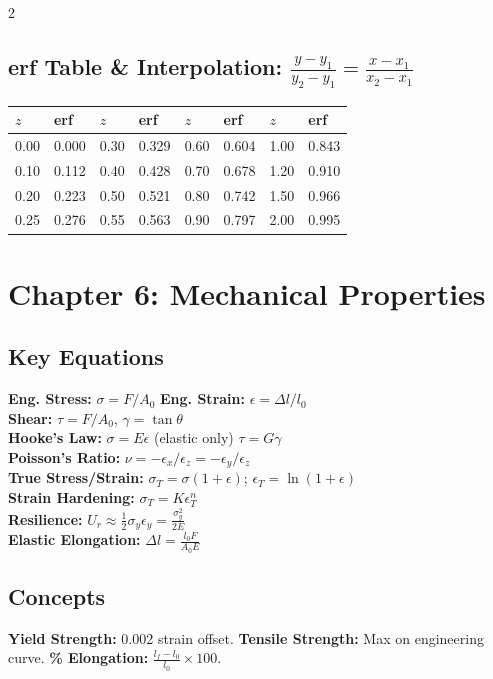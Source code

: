 \documentclass[7pt]{article}
\begin{document}
\begin{multicols*}{2}
\subsection*{erf Table \& Interpolation: $\frac{y-y_1}{y_2-y_1}=\frac{x-x_1}{x_2-x_1}$}
{\scriptsize
\begin{tabular}{@{}ll@{\ }ll@{\ }ll@{\ }ll@{}}
\toprule
$z$ & erf & $z$ & erf & $z$ & erf & $z$ & erf\\
\midrule
0.00&0.000 & 0.30&0.329 & 0.60&0.604 & 1.00&0.843\\
0.10&0.112 & 0.40&0.428 & 0.70&0.678 & 1.20&0.910\\
0.20&0.223 & 0.50&0.521 & 0.80&0.742 & 1.50&0.966\\
0.25&0.276 & 0.55&0.563 & 0.90&0.797 & 2.00&0.995\\
\bottomrule
\end{tabular}}

\section*{Chapter 6: Mechanical Properties}
\subsection*{Key Equations}
\textbf{Eng. Stress:} $\sigma=F/A_0$ \quad \textbf{Eng. Strain:} $\epsilon=\Delta l/l_0$ \\
\textbf{Shear:} $\tau=F/A_0$, \; $\gamma=\tan\theta$ \\
\textbf{Hooke's Law:} $\sigma=E\epsilon$ \; (elastic only) \quad $\tau=G\gamma$ \\
\textbf{Poisson's Ratio:} $\nu=-\epsilon_x/\epsilon_z = -\epsilon_y/\epsilon_z$ \\
\textbf{True Stress/Strain:} $\sigma_T=\sigma(1+\epsilon)$; \; $\epsilon_T=\ln(1+\epsilon)$ \\
\textbf{Strain Hardening:} $\sigma_T=K\epsilon_T^n$ \\
\textbf{Resilience:} $U_r\approx\frac{1}{2}\sigma_y\epsilon_y=\frac{\sigma_y^2}{2E}$ \\
\textbf{Elastic Elongation:} $\Delta l = \frac{l_0 F}{A_0 E}$
\subsection*{Concepts}
\textbf{Yield Strength:} 0.002 strain offset. \textbf{Tensile Strength:} Max on engineering curve. \textbf{\% Elongation:} $\frac{l_f-l_0}{l_0}\times100$.


\end{multicols*}
\end{document}
